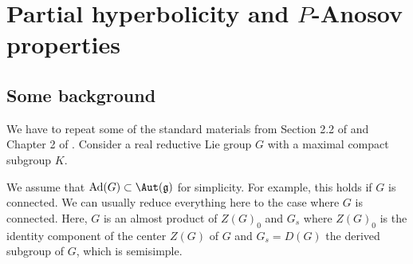% 
% 

 



\section{Partial hyperbolicity and $P$-Anosov properties} \label{sec:phyp} 



\subsection{Some background} \label{sub:background} 
We have to repeat some of the standard materials from
Section 2.2 of \cite{GGKW17ii} and Chapter 2 of \cite{GJT}. 
Consider a real reductive Lie group $G$ with a maximal compact subgroup $K$. 

We assume that $\mathrm{Ad}(G) \subset \Aut(\mathfrak{g})$ for simplicity. 
For example, this holds if $G$ is connected. We can usually reduce everything here to 
the case where $G$ is connected. 
Here, $G$ is an almost product of $Z(G)_0$ and $G_s$ 
where $Z(G)_0$ is the identity component of the center $Z(G)$ of $G$ 
and $G_s = D(G)$ the derived subgroup of $G$, which is semisimple. 


